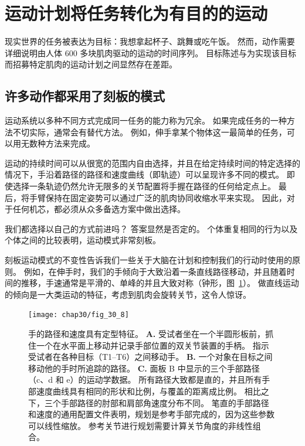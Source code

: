 \section{运动计划将任务转化为有目的的运动}

现实世界的任务被表达为目标：我想拿起杯子、跳舞或吃午饭。
然而，动作需要详细说明由人体 600 多块肌肉驱动的运动的时间序列。
目标陈述与为实现该目标而招募特定肌肉的运动计划之间显然存在差距。



\subsection{许多动作都采用了刻板的模式}

运动系统以多种不同方式完成同一任务的能力称为冗余。 
如果完成任务的一种方法不切实际，通常会有替代方法。 
例如，伸手拿某个物体这一最简单的任务，可以用无数种方法来完成。


运动的持续时间可以从很宽的范围内自由选择，并且在给定持续时间的特定选择的情况下，手沿着路径的路径和速度曲线（即轨迹）可以呈现许多不同的模式。
即使选择一条轨迹仍然允许无限多的关节配置将手握在路径的任何给定点上。
最后，将手臂保持在固定姿势可以通过广泛的肌肉协同收缩水平来实现。
因此，对于任何机芯，都必须从众多备选方案中做出选择。


我们都选择以自己的方式前进吗？
答案显然是否定的。
个体重复相同的行为以及个体之间的比较表明，运动模式非常刻板。


刻板运动模式的不变性告诉我们一些关于大脑在计划和控制我们的行动时使用的原则。
例如，在伸手时，我们的手倾向于大致沿着一条直线路径移动，并且随着时间的推移，手速通常是平滑的、单峰的并且大致对称（钟形，图~\ref{fig:30_8}）。
做直线运动的倾向是一大类运动的特征，考虑到肌肉会旋转关节，这令人惊讶。


\begin{figure}[htbp]
	\centering
	\texttt{[image: chap30/fig\_30\_8]}
	\caption{手的路径和速度具有定型特征\cite{morasso1981spatial}。
		\textbf{A.} 受试者坐在一个半圆形板前，抓住一个在水平面上移动并记录手部位置的双关节装置的手柄。
		指示受试者在各种目标（T1–T6）之间移动手。
		\textbf{B.} 一个对象在目标之间移动他的手时所追踪的路径。
		\textbf{C.} 面板 B 中显示的三个手部路径（c、d 和 e）的运动学数据。
		所有路径大致都是直的，并且所有手部速度曲线具有相同的形状和比例，与覆盖的距离成比例。
		相比之下，三个手部路径的肘部和肩部角速度分布不同。
		笔直的手部路径和速度的通用配置文件表明，规划是参考手部完成的，因为这些参数可以线性缩放。
		参考关节进行规划需要计算关节角度的非线性组合。}
	\label{fig:30_8}
\end{figure}


